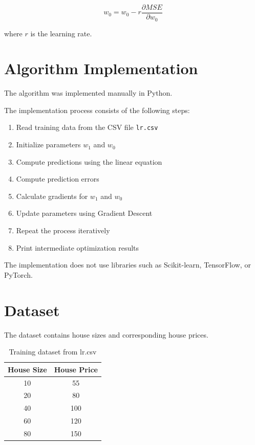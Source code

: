 \documentclass[12pt]{article}
\begin{document}
\[
w_0 = w_0 - r \frac{\partial MSE}{\partial w_0}
\]

where \(r\) is the learning rate.

\section{Algorithm Implementation}

The algorithm was implemented manually in Python.

The implementation process consists of the following steps:

\begin{enumerate}
    \item Read training data from the CSV file \texttt{lr.csv}
    \item Initialize parameters \(w_1\) and \(w_0\)
    \item Compute predictions using the linear equation
    \item Compute prediction errors
    \item Calculate gradients for \(w_1\) and \(w_0\)
    \item Update parameters using Gradient Descent
    \item Repeat the process iteratively
    \item Print intermediate optimization results
\end{enumerate}

The implementation does not use libraries such as Scikit-learn, TensorFlow, or PyTorch.

\section{Dataset}

The dataset contains house sizes and corresponding house prices.

\begin{table}[h]
\centering
\begin{tabular}{cc}
\toprule
House Size & House Price \\
\midrule
10 & 55 \\
20 & 80 \\
40 & 100 \\
60 & 120 \\
80 & 150 \\
\bottomrule
\end{tabular}
\caption{Training dataset from lr.csv}
\end{table}
\end{document}
